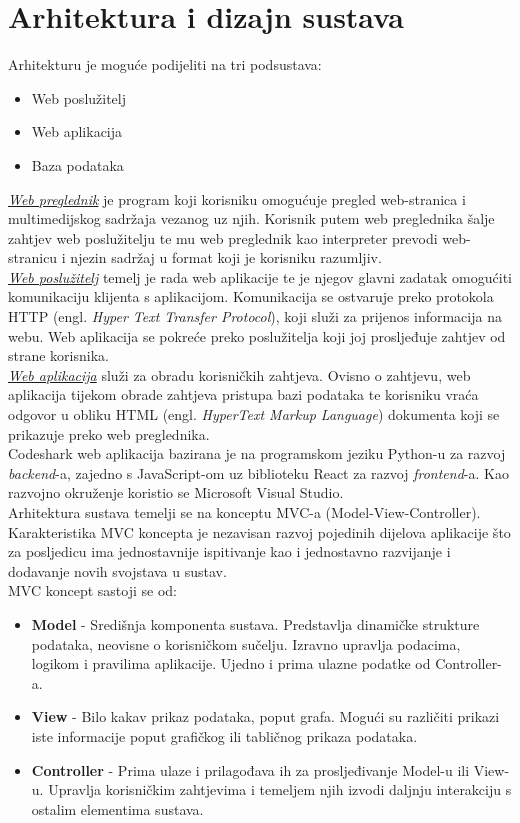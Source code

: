 \chapter{Arhitektura i dizajn sustava}
		
		  \noindent Arhitekturu je moguće podijeliti na tri podsustava:
	\begin{itemize}
		\item 	Web poslužitelj
		\item 	Web aplikacija
		\item 	Baza podataka
	\end{itemize}

		\underline{\textit{Web preglednik}} je program koji korisniku omogućuje pregled web-stranica i multimedijskog sadržaja vezanog uz njih. Korisnik putem web preglednika šalje zahtjev web poslužitelju te mu web preglednik kao interpreter prevodi web-stranicu i njezin sadržaj u format koji je korisniku razumljiv. \\
		\underline{\textit{Web poslužitelj}} temelj je rada web aplikacije te je njegov glavni zadatak omogućiti komunikaciju klijenta s aplikacijom. Komunikacija se ostvaruje preko protokola HTTP (engl. \textit{Hyper Text Transfer Protocol}), koji služi za prijenos informacija na webu. Web aplikacija se pokreće preko poslužitelja koji joj prosljeđuje zahtjev od strane korisnika. \\
		\underline{\textit{Web aplikacija}} služi za obradu korisničkih zahtjeva. Ovisno o zahtjevu, web aplikacija tijekom obrade zahtjeva pristupa bazi podataka te korisniku vraća odgovor u obliku HTML (engl. \textit{HyperText Markup Language}) dokumenta koji se prikazuje preko web preglednika. \\
		Codeshark web aplikacija bazirana je na programskom jeziku Python-u za razvoj \textit{backend}-a, zajedno s JavaScript-om uz biblioteku React za razvoj \textit{frontend}-a. Kao razvojno okruženje koristio se Microsoft Visual Studio. \\
		Arhitektura sustava temelji se na konceptu MVC-a (Model-View-Controller). Karakteristika MVC koncepta je nezavisan razvoj pojedinih dijelova aplikacije što za posljedicu ima jednostavnije ispitivanje kao i jednostavno razvijanje i dodavanje novih svojstava u sustav. \\
		\noindent MVC koncept sastoji se od:
	
	\begin{itemize}
		\item \textbf{Model} - Središnja komponenta sustava. Predstavlja dinamičke strukture podataka, neovisne o korisničkom sučelju. Izravno upravlja podacima, logikom i pravilima aplikacije. Ujedno i prima ulazne podatke od Controller-a.
		\item \textbf{View} - Bilo kakav prikaz podataka, poput grafa. Mogući su različiti prikazi iste informacije poput grafičkog ili tabličnog prikaza podataka.
		\item \textbf{Controller} - Prima ulaze i prilagođava ih za prosljeđivanje Model-u ili View-u. Upravlja korisničkim zahtjevima i temeljem njih izvodi daljnju interakciju s ostalim elementima sustava.
	\end{itemize}
		

